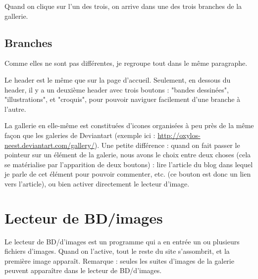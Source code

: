 \documentclass[french]{report}
\theoremstyle{plain}
\begin{document}
			Quand on clique sur l'un des trois, on arrive dans une des trois branches de la gallerie.

		\subsection{Branches}
			Comme elles ne sont pas différentes, je regroupe tout dans le même paragraphe.

			Le header est le même que sur la page d'accueil. Seulement, en dessous du header, il y a un deuxième header avec trois boutons : "bandes dessinées", "illustrations", et "croquis", pour pouvoir naviguer facilement d'une branche à l'autre.

			La gallerie en elle-même est constituées d'icones organisées à peu près de la même façon que les galeries de Deviantart (exemple ici : \url{http://oxylos-neest.deviantart.com/gallery/}). Une petite différence : quand on fait passer le pointeur sur un élément de la galerie, nous avons le choix entre deux choses (cela se matérialise par l'apparition de deux boutons) : lire l'article du blog dans lequel je parle de cet élément pour pouvoir commenter, etc. (ce bouton est donc un lien vers l'article), ou bien activer directement le lecteur d'image.

	\section{Lecteur de BD/images}
		Le lecteur de BD/d'images est un programme qui a en entrée un ou plusieurs fichiers d'images. Quand on l'active, tout le reste du site s'assombrit, et la première image apparaît. Remarque : seules les suites d'images de la galerie peuvent apparaître dans le lecteur de BD/d'images.
\end{document}
